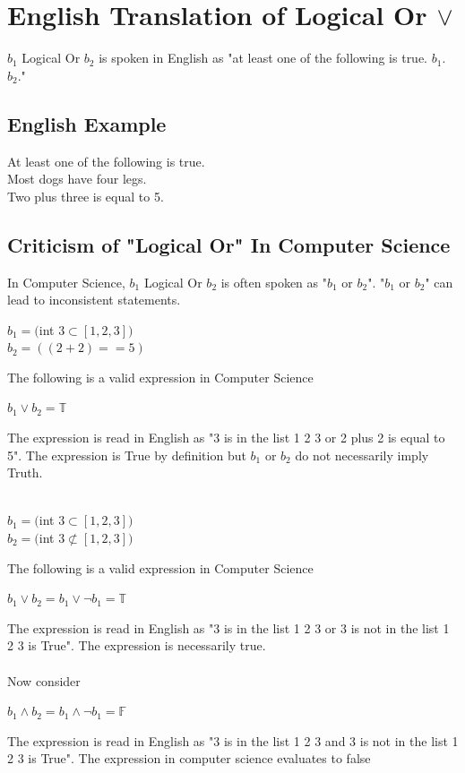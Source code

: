 \documentclass[11pt]{article}
\begin{document}
\section{English Translation of Logical Or $\lor$}
$b_1$ Logical Or $b_2$ is spoken in English as "at least one of the following is true. $b_1$. $b_2.$"
\subsection{English Example}
At least one of the following is true.\\
Most dogs have four legs.\\
Two plus three is equal to 5.
\subsection{Criticism of "Logical Or" In Computer Science}
In Computer Science, $b_1$ Logical Or $b_2$ is often spoken as "$b_1$ or $b_2$". "$b_1$ or $b_2$" can lead to inconsistent statements.\\
\begin{center}
$b_1 = ($int $3 \subset [1,2,3])$\\
\vspace{2mm}
$b_2 = ((2 + 2) == 5)$\\
\end{center}
\vspace{2mm}
The following is a valid expression in Computer Science
\begin{center}
$
b_1 \lor b_2 = \mathbb{T}
$
\end{center}
The expression is read in English as "3 is in the list 1 2 3 or 2 plus 2 is equal to 5". The expression is True by definition but $b_1$ or $b_2$
do not necessarily imply Truth.\\\\
\begin{center}
$b_1 = ($int $3 \subset [1,2,3])$\\
\vspace{2mm}
$b_2 = ($int $3 \not \subset [1,2,3])$\\
\end{center}
\vspace{2mm}
The following is a valid expression in Computer Science
\begin{center}
$
 b_1 \lor b_2 =  b_1 \lor \lnot b_1 = \mathbb{T}
$
\end{center}
The expression is read in English as "3 is in the list 1 2 3 or 3 is not in the list 1 2 3 is True". The expression is necessarily true.\\
\\Now consider
\begin{center}
$
 b_1 \land b_2 =  b_1 \land \lnot b_1 = \mathbb{F}
$
\end{center}
The expression is read in English as "3 is in the list 1 2 3 and 3 is not in the list 1 2 3 is True". The expression in computer science evaluates to false
\end{document}
